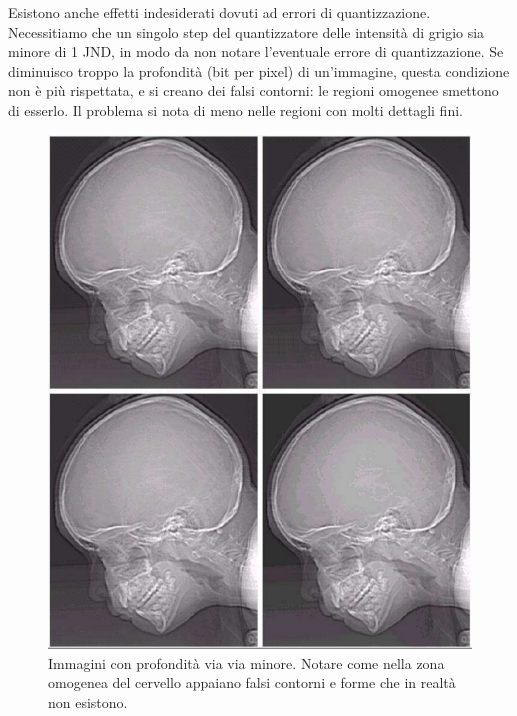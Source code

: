 \documentclass[a4paper,11pt]{article}
\begin{document}
Esistono anche effetti indesiderati dovuti ad errori di quantizzazione.
Necessitiamo che un singolo step del quantizzatore delle intensità di grigio sia minore di 1 JND, in modo da non notare l'eventuale errore di quantizzazione.
Se diminuisco troppo la profondità (bit per pixel) di un'immagine, questa condizione non è più rispettata, e si creano dei falsi contorni: le regioni omogenee smettono di esserlo.
Il problema si nota di meno nelle regioni con molti dettagli fini.

\renewcommand{\thefigure}{5.6}
\begin{figure}[!h]
  \centering
    \includegraphics[scale=0.4]{images/5/skulls_bit_depth.png}
    \caption{Immagini con profondità via via minore. Notare come nella zona omogenea del cervello appaiano falsi contorni e forme che in realtà non esistono.}
\end{figure}
\end{document}
